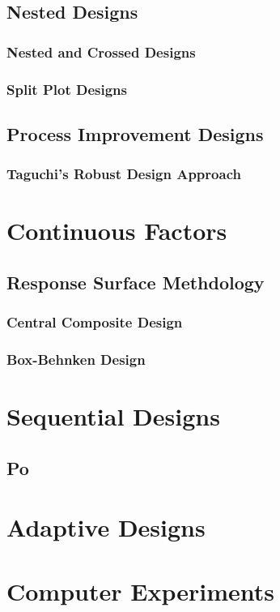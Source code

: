 \subsection{Nested Designs}


\subsubsection{Nested and Crossed Designs}

\subsubsection{Split Plot Designs}




\subsection{Process Improvement Designs}

\subsubsection{Taguchi's Robust Design Approach}



\section{Continuous Factors}



\subsection{Response Surface Methdology}

\subsubsection{Central Composite Design}

\subsubsection{Box-Behnken Design}




\section{Sequential Designs}

\subsection{Po}



\section{Adaptive Designs}



\section{Computer Experiments}

